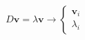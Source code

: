 \documentclass[preview]{standalone}
\begin{document}
\begin{align*}
D \bm v = \lambda \bm v \to \begin{cases} \bm v_i\\ \lambda_i \end{cases}
\end{align*}
\end{document}
